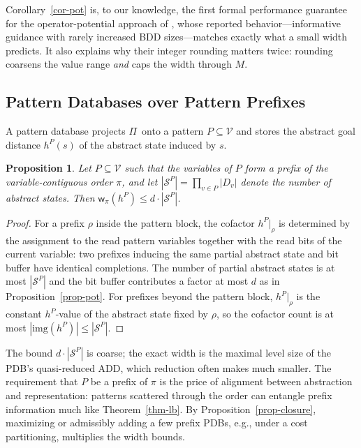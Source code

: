 \documentclass[letterpaper]{article}
\newcommand{\task}{\ensuremath{\Pi}}
\newcommand{\vars}{\ensuremath{\mathcal{V}}}
\newcommand{\states}{\ensuremath{\mathcal{S}}}
\newcommand{\width}{\ensuremath{\mathsf{w}}}
\newcommand{\img}{\ensuremath{\mathrm{img}}}
\theoremstyle{plain}
\newtheorem{proposition}{Proposition}
\theoremstyle{definition}
\theoremstyle{remark}
\begin{document}
Corollary~\ref{cor-pot} is, to our knowledge, the first formal
performance guarantee for the operator-potential approach of
\citet{fiser-et-al-aaai2022,fiser-et-al-aij2024}, whose reported
behavior---informative guidance with rarely increased BDD
sizes---matches exactly what a small width predicts. It also explains
why their integer rounding matters twice: rounding coarsens the value
range \emph{and} caps the width through $M$.

\subsection{Pattern Databases over Pattern Prefixes}

A pattern database \citep[PDB;][]{culberson-schaeffer-compint1998,%
edelkamp-ecp2001} projects \task\ onto a pattern
$P \subseteq \vars$ and stores the abstract goal distance
$h^{P}(s)$ of the abstract state induced by $s$.

\begin{proposition}
\label{prop-pdb}
Let $P \subseteq \vars$ such that the variables of $P$ form a prefix of
the variable-contiguous order $\pi$, and let
$|\states^{P}| = \prod_{v \in P} |D_v|$ denote the number of abstract
states. Then $\width_\pi(h^{P}) \leq d \cdot |\states^{P}|$.
\end{proposition}

\begin{proof}
For a prefix $\rho$ inside the pattern block, the cofactor
$h^{P}|_\rho$ is determined by the assignment to the read pattern
variables together with the read bits of the current variable: two
prefixes inducing the same partial abstract state and bit buffer have
identical completions. The number of partial abstract states is at most
$|\states^{P}|$ and the bit buffer contributes a factor at most $d$ as
in Proposition~\ref{prop-pot}. For prefixes beyond the pattern block,
$h^{P}|_\rho$ is the constant $h^{P}$-value of the abstract state fixed
by $\rho$, so the cofactor count is at most
$|\img(h^{P})| \leq |\states^{P}|$.
\end{proof}

The bound $d \cdot |\states^{P}|$ is coarse; the exact width is the
maximal level size of the PDB's quasi-reduced ADD, which reduction
often makes much smaller. The requirement that $P$ be a prefix of $\pi$
is the price of alignment between abstraction and representation:
patterns scattered through the order can entangle prefix information
much like Theorem~\ref{thm-lb}. By Proposition~\ref{prop-closure},
maximizing or admissibly adding a few prefix PDBs, e.g., under a cost
partitioning, multiplies the width bounds.
\end{document}
